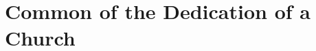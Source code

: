 {
\section{Common of the Dedication of a Church}
\label{commondedicationofchurch}
\subtitle{I \& II Vespers}
\medskip

\def\prepsalmtitleone{\needspace{8\baselineskip}}
\def\postpsalmtitletwo{\needspace{8\baselineskip}}
\def\prepsalmtwoverses{\vspace{-0.05\baselineskip}}
\def\prepsalmfiveverses{\smallskip}
\def\prevr{\needspace{10\baselineskip}}
\def\definevesperspropers{
  \def\premagverses{\oldneedspace{15\baselineskip}}
}
\def\definevesperspropersalt{
}
\def\vesperspropersnote{At II Vespers:}
\def\vesperspropersaltnote{At I Vespers:}
\def\prehymntranslation{\vspace{-0.5\baselineskip}}

\bigskip
{}
}